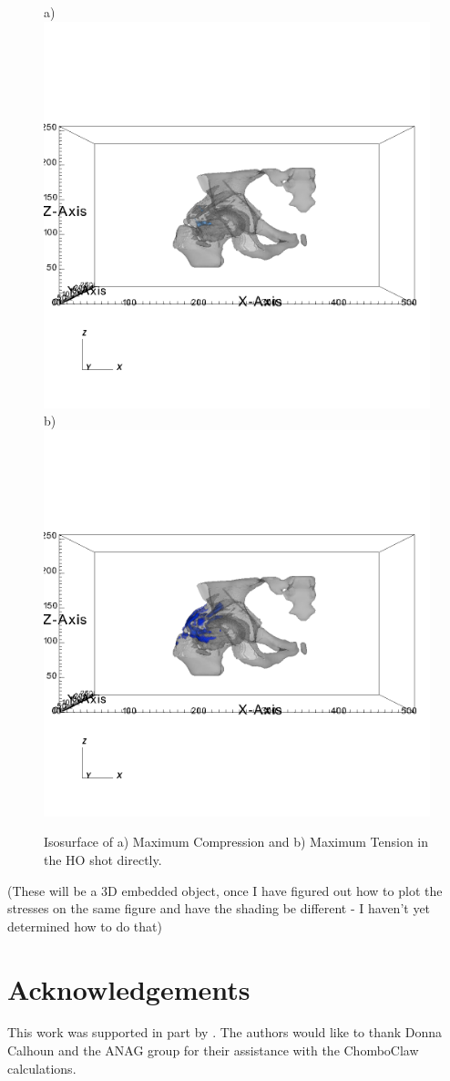 \documentclass{article}
\begin{document}
\begin{figure}[ht]
\begin{center}
a)\includegraphics[scale=.25]{hip_comp_direct.png}
b)\includegraphics[scale=.25]{hip_tens_direct_ydir.png}
\caption{Isosurface of a) Maximum Compression and b) Maximum Tension in the HO shot directly.}
\end{center}
\end{figure}
(These will be a 3D embedded object, once I have figured out how to plot the stresses on the same 
figure and have the shading be different - I haven't yet determined how to do that)

\section*{Acknowledgements}
This work was supported in part by . The authors would like to thank Donna Calhoun and the ANAG 
group for their assistance with the ChomboClaw calculations.
\end{document}
